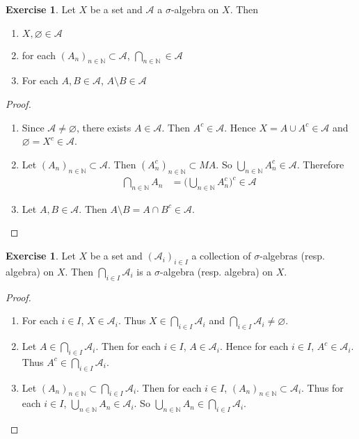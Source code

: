 \documentclass[12pt]{amsart}
\theoremstyle{definition}
\newtheorem{ex}[definition]{Exercise}
\newcommand{\sig}{\sigma}
\newcommand{\N}{\mathbb{N}}
\newcommand{\MA}{\mathcal{A}}
\newcommand{\lex}[1]{\label{ex:#1}}
\begin{document}
	\begin{ex} \lex{00000} 
		Let $X$ be a set and $\MA$ a $\sig$-algebra on $X$. Then 
		\begin{enumerate}
			\item $X, \varnothing \in \MA$
			\item for each $(A_n)_{n \in \N} \subset \MA$, $\bigcap\limits_{n \in \N} \in \MA$
			\item For each $A, B \in \MA$, $A \setminus B \in \MA$  
		\end{enumerate}
	\end{ex}
	
	\begin{proof}\
		\begin{enumerate}
			\item Since $\MA \neq \varnothing$, there exists $A \in \MA$. Then $A^c \in \MA$. Hence $X = A \cup A^c \in \MA$ and $\varnothing = X^c \in \MA$.
			\item Let $(A_n)_{n \in \N} \subset \MA$. Then $(A_n^c)_{n \in \N} \subset MA$. So $\bigcup\limits_{n \in \N}A_n^c \in \MA$. Therefore \begin{align*}
				\bigcap\limits_{n \in \N}A_n 
				&= \bigg(\bigcup\limits_{n \in \N}A_n^c\bigg)^c \in \MA
			\end{align*}
			\item Let $A,B \in \MA$. Then $A \setminus B = A \cap B^c \in \MA$. 
		\end{enumerate}
	\end{proof}
	
	\begin{ex} \lex{00000} 
		Let $X$ be a set and $(\MA_i)_{i \in I}$ a collection of $\sig$-algebras (resp. algebra) on $X$. Then $\bigcap\limits_{i \in I}\MA_i$ is a $\sig$-algebra (resp. algebra) on $X$.
	\end{ex}
	
	\begin{proof}\
		\begin{enumerate}
			\item For each $i \in I$, $X \in \MA_i$. Thus $X \in \bigcap\limits_{i \in I}\MA_i$ and $\bigcap\limits_{i \in I}\MA_i \neq \varnothing$.
			\item Let $A \in \bigcap\limits_{i \in I}\MA_i$. Then for each $i \in I$, $A \in \MA_i$. Hence for each $i \in I$, $A^c \in \MA_i$. Thus $A^c \in \bigcap\limits_{i \in I}\MA_i$. 
			\item Let $(A_n)_{n \in \N} \subset \bigcap\limits_{i \in I}\MA_i$. Then for each $i \in I$, $(A_n)_{n \in \N} \subset \MA_i$. Thus for each $i \in I$, $\bigcup\limits_{n \in \N}A_n \in \MA_i$. So $\bigcup\limits_{n \in \N}A_n \in \bigcap\limits_{i \in I}\MA_i$.
		\end{enumerate}
	\end{proof}
	
\end{document}
